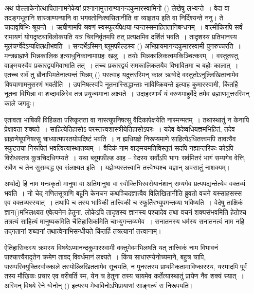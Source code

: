 अथ पोल्लाकेनोत्थापितानामनेकेषां प्रश्नानामुत्तराण्यानन्दकुमारस्वामिनो () लेखेषु लभ्यन्ते~। वेदा वा तदङ्गभूतानि शास्त्राण्यन्यानि वा भगवतो\break निःश्वसितानीति वा व्याहृतय इति वा निर्दिश्यन्ते ननु। ते चादावृषिभिः श्रूयन्ते~। ऋषीणामपि श्रवणं स्वस्फूर्त्यपेक्षया-प्यन्तस्समाहिततानिबन्धनम्~। वाल्मीकिरपि सर्वं रामायणं योगदृष्ट्या\break विलोकयति यत्र चिरनिर्वृतमपि तत् प्रत्यक्षमिव दर्शितं भवति~। तादृशस्य प्रतिभानस्य मूलं\break चर्ग्वेदेऽप्यक्षिलक्षीभवति~। सन्दर्भेऽस्मिन् ब्लूमफील्डस्य () अभिप्रायमानन्दकुमारस्वामी पुनरुच्चरति~। मन्त्रब्राह्मणे भिन्नकालिक इत्याधुनिकानामाग्रहः खलु~। तयोः भिन्नकालिकत्वमकिञ्चित्करम्~। वस्तुतस्तु वाङ्मयस्यैव प्रकारद्वयमिवाभाति तत्~। तच्च प्रकारद्वयं समकालिकतयैव विभावितमा च बहोः कालात्~। एतच्च सर्वं तु ब्रौनाभिमतेनात्यन्तं भिन्नम् () यस्त्वाह यदुत्तरस्मिन् काल ऋग्वेदे वस्तुतोऽनुल्लिखितानामेव विषयाणामनुसरणं भवतीति~। उपनिषत्स्वपि नूतनास्सिद्धान्ताः नाविष्क्रियन्ते इत्याह कुमारस्वामी, किंतर्हि नूतना विभिन्ना वा शब्दावलिरेव तत्र प्रयुज्यमाना लक्ष्यते~। उदाहरणार्थं यं वरुणमाहुर्वेदे तमेव ब्रह्माणमुत्तरस्मिन् काले जगदुः।

एतावता भाषिकी विहिन्नता परिष्कृतता वा नास्त्युपनिषत्सु वैदिकापेक्षयेति नास्मन्मतम्~। तथास्थातुं न केनापि प्रेक्षावता शक्यते~। साहित्येतिहासोऽ-परस्तत्त्वशास्त्रीयेतिहासोऽपरः~। यदेव वेदेष्वधियज्ञमभिहितं, तदेव ब्राह्मणेषूपनिषत्सु चाध्यात्मपरतयोपदिष्टं भवति~। न ह्यधियज्ञे निरूप्यमाणे साहित्येऽधितत्त्वमपि तावत्यैव स्फुटतया निरूपितं भवत्वित्यास्थातव्यम्~। वैदिकं नाम वाङ्मयमतिविस्तृतं सदपि नह्यान्तरिकः कोऽपि विरोधस्तत्र कुत्रचिदधिगम्यते~। यथा ब्लूमफील्ड आह – वेदस्य सर्वोऽपि भागः सर्वमितरं भागं सम्यगेव वेत्ति, सर्वेण च तेन सुसम्बद्ध एव संलक्ष्यत इति~। यज्ञेभ्यस्तत्त्वानि तत्त्वेभ्यश्च यज्ञान् अवसातुं नाशक्यम्।

अर्थाद्ये हि नाम मन्त्रकृतो मानुषा वा अतिमानुषा वा स्वोक्तिभिरवसेयानंशान् सम्यगेव प्रत्यपद्यन्तेत्येव वक्तव्यं भवति~। नो चेद् गणितसूत्राणि बहूनि केनचन कथञ्चिदज्ञात्वैव विलिखितानीति ब्रुवतो वचने यस्साहसस्स एव वक्तव्यस्स्यात्~। तथापि च तस्य भाषिकी तात्त्विकी च स्फूर्तिरभ्युपगन्तव्या भविष्यति~। वेदेषु ताक्षिकं ज्ञान()मभिलक्ष्यत एवेत्यनेन हेतुना, लोकेऽपि तादृशस्य ज्ञानस्य पश्चादेव तथा वचनं शक्यसंभवमिति हेतोश्च तत्रत्यं साहित्यं मानुष्यकमिति चैतिहासिकमिति चाभ्युगन्तव्यमेव~। सनातनस्य धर्मस्य सनातनत्वं नाम नहि तद्गतानां शब्दानां तथात्वेनाभिसन्धीयते किंतर्हि तत्रत्यानां तत्त्वानाम्।

ऐतिहासिकस्य क्रमस्य विषयेऽप्यानन्दकुमारस्वामी वक्तुमेवमभिलषति यत् तात्त्विकं नाम विभावनं पाश्चात्त्यैरादृतेन क्रमेण तावद् विवर्धमानं लक्ष्यते~। किंच साधारण्येनोच्यमाने, बहुत्र चापि, पारम्परिक्युक्तिरर्वाक्काले तस्योल्लिखिततामेव सूचयति, न पुनस्तस्य प्राथमिकतामाविष्कारस्य, यस्मादपि पूर्वं तस्य मौखिकः प्रचार एव वरीवर्ति स्म, येन च हेतुना तस्य चायमेव कर्तेत्यास्थातुं प्रायेण नैव शक्यं स्यात्~। अस्मिन् विषये रेने ग्वेनोन् () इत्यस्य मेधाविनोऽभिप्रायाणां साङ्गत्यं स निरूपयति।

